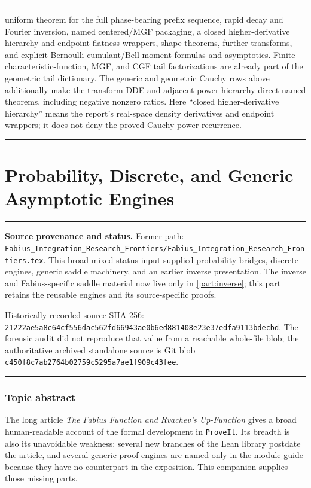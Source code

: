 \documentclass[11pt,oneside]{article}
\theoremstyle{definition}
\theoremstyle{remark}
\newenvironment{boxedremark}{%
  \par\smallskip\noindent\begin{center}\begin{minipage}{0.94\textwidth}%
  \color{black}\hrule\vspace{0.6em}\small
}{%
  \vspace{0.6em}\hrule\end{minipage}\end{center}\smallskip
}
\begin{document}
\begin{boxedremark}
uniform theorem for the full phase-bearing prefix sequence, rapid decay and Fourier
inversion, named centered/MGF packaging, a closed
higher-derivative hierarchy and endpoint-flatness wrappers, shape theorems, further
transforms, and explicit Bernoulli-cumulant/Bell-moment formulas and asymptotics.  Finite
characteristic-function, MGF, and CGF tail factorizations are already part of the geometric
tail dictionary.
The generic and geometric Cauchy rows above additionally make the transform DDE and
adjacent-power hierarchy direct named theorems, including negative nonzero ratios.  Here
``closed higher-derivative hierarchy'' means the report's real-space density derivatives
and endpoint wrappers; it does not deny the proved Cauchy-power recurrence.
\end{boxedremark}


\clearpage
\part{Probability, Discrete, and Generic Asymptotic Engines}
\label{part:integration}
\begin{boxedremark}
\textbf{Source provenance and status.} Former path: \nolinkurl{Fabius_Integration_Research_Frontiers/Fabius_Integration_Research_Frontiers.tex}.  This broad mixed-status input supplied probability bridges, discrete engines, generic saddle machinery, and an earlier inverse presentation.  The inverse and Fabius-specific saddle material now live only in \cref{part:inverse}; this part retains the reusable engines and its source-specific proofs.\par\smallskip Historically recorded source SHA-256: \nolinkurl{21222ae5a8c64cf556dac562fd66943ae0b6ed881408e23e37edfa9113bdecbd}.  The forensic audit did not reproduce that value from a reachable whole-file blob; the authoritative archived standalone source is Git blob \nolinkurl{c450f8c7ab2764b02759c5295a7ae1f909c43fee}.
\end{boxedremark}
\section*{Topic abstract}
The long article \emph{The Fabius Function and Rvachev's Up-Function} gives a broad
human-readable account of the formal development in \texttt{ProveIt}.  Its breadth is also
its unavoidable weakness: several new branches of the Lean library postdate the article,
and several generic proof engines are named only in the module guide because they have no
counterpart in the exposition.  This companion supplies those missing parts.
\end{document}
